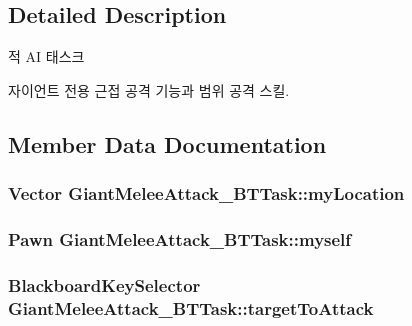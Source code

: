 \subsection{Detailed Description}
적 AI 태스크 

자이언트 전용 근접 공격 기능과 범위 공격 스킬. 

\subsection{Member Data Documentation}
\subsubsection[{\texorpdfstring{my\+Location}{myLocation}}]{\setlength{\rightskip}{0pt plus 5cm}Vector Giant\+Melee\+Attack\+\_\+\+B\+T\+Task\+::my\+Location\hspace{0.3cm}{\ttfamily [private]}}\hypertarget{class_giant_melee_attack___b_t_task_a6d7cb8d701fc5a62d10180592a1727bf}{}\label{class_giant_melee_attack___b_t_task_a6d7cb8d701fc5a62d10180592a1727bf}
\subsubsection[{\texorpdfstring{myself}{myself}}]{\setlength{\rightskip}{0pt plus 5cm}Pawn Giant\+Melee\+Attack\+\_\+\+B\+T\+Task\+::myself\hspace{0.3cm}{\ttfamily [private]}}\hypertarget{class_giant_melee_attack___b_t_task_a30dd53d02e844eab55652c2fc628b53c}{}\label{class_giant_melee_attack___b_t_task_a30dd53d02e844eab55652c2fc628b53c}
\subsubsection[{\texorpdfstring{target\+To\+Attack}{targetToAttack}}]{\setlength{\rightskip}{0pt plus 5cm}Blackboard\+Key\+Selector Giant\+Melee\+Attack\+\_\+\+B\+T\+Task\+::target\+To\+Attack}\hypertarget{class_giant_melee_attack___b_t_task_ace477d8d2d2c02e1ae5220e36e60b6ac}{}\label{class_giant_melee_attack___b_t_task_ace477d8d2d2c02e1ae5220e36e60b6ac}
